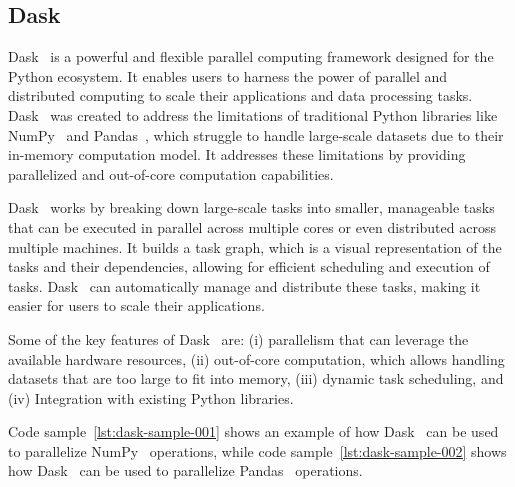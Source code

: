 \subsection{Dask}
\label{subsec:dask}

Dask~\cite{dask} is a powerful and flexible parallel computing framework designed for the Python ecosystem.
It enables users to harness the power of parallel and distributed computing to scale their applications and data processing tasks.
Dask~\cite{dask} was created to address the limitations of traditional Python libraries like NumPy~\cite{numpy} and Pandas~\cite{pandas}, which struggle to handle large-scale datasets due to their in-memory computation model.
It addresses these limitations by providing parallelized and out-of-core computation capabilities.

Dask~\cite{dask} works by breaking down large-scale tasks into smaller, manageable tasks that can be executed in parallel across multiple cores or even distributed across multiple machines.
It builds a task graph, which is a visual representation of the tasks and their dependencies, allowing for efficient scheduling and execution of tasks.
Dask~\cite{dask} can automatically manage and distribute these tasks, making it easier for users to scale their applications.

Some of the key features of Dask~\cite{dask} are:
(i) parallelism that can leverage the available hardware resources,
(ii) out-of-core computation, which allows handling datasets that are too large to fit into memory,
(iii) dynamic task scheduling, and
(iv) Integration with existing Python libraries.

Code sample~\ref{lst:dask-sample-001} shows an example of how Dask~\cite{dask} can be used to parallelize NumPy~\cite{numpy} operations, while code sample~\ref{lst:dask-sample-002} shows how Dask~\cite{dask} can be used to parallelize Pandas~\cite{pandas} operations.



